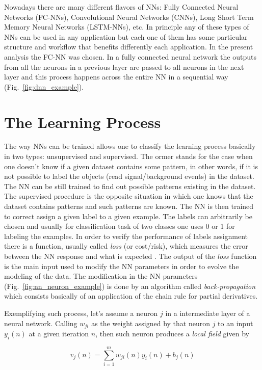 Nowadays there are many different flavors of NNs: Fully Connected Neural Networks (FC-NNs), Convolutional Neural Networks (CNNs), Long Short Term Memory Neural Networks (LSTM-NNs), etc. In principle any of these types of NNs can be used in any application but each one of them has some particular structure and workflow that benefits differently each application. In the present analysis the FC-NN was chosen. In a fully connected neural network the outputs from all the neurons in a previous layer are passed to all neurons in the next layer and this process happens across the entire NN in a sequential way (Fig.~\ref{fig:dnn_example}).

\section{The Learning Process}
The way NNs can be trained allows one to classify the learning process basically in two types: unsupervised and supervised. The ormer stands for the case when one doesn't know if a given dataset contains some pattern, in other words, if it is not possible to label the objects (read signal/background events) in the dataset. The NN can be still trained to find out possible patterns existing in the dataset. The supervised procedure is the opposite situation in which one knows that the dataset contains patterns and such patterns are known. The NN is then trained to correct assign a given label to a given example. The labels can arbitrarily be chosen and usually for classification task of two classes one uses 0 or 1 for labeling the examples. In order to verify the performance of labels assignment there is a function, usually called \textit{loss} (or cost/risk), which measures the error between the NN response and what is expected \cite{bib:SimonHaykin}. The output of the \textit{loss} function is the main input used to modify the NN parameters in order to evolve the modeling of the data. The modification in the NN parameters (Fig.~\ref{fig:nn_neuron_example}) is done by an algorithm called \textit{back-propagation} which consists basically of an application of the chain rule for partial derivatives.

Exemplifying such process, let's assume a neuron $j$ in a intermediate layer of a neural network. Calling $w_{ji}$ as the weight assigned by that neuron $j$ to an input $y_{i}(n)$ at a given iteration $n$, then such neuron produces a \textit{local field} given by

\begin{equation}
v_{j}(n) = \sum_{i=1}^{m} w_{ji}(n)y_{i}(n) + b_{j}(n)
\label{neuron_local_field}
\end{equation}

